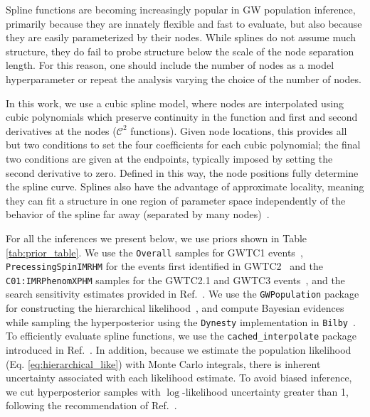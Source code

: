 \documentclass[%
 reprint,
 amsmath,amssymb,
 aps,
 prd,
]{revtex4-2}
\begin{document}
Spline functions are becoming increasingly popular in \ac{GW} population inference, primarily because they are innately flexible and fast to evaluate, but also because they are easily parameterized by their nodes. While splines do not assume much structure, they do fail to probe structure below the scale of the node separation length. For this reason, one should include the number of nodes as a model hyperparameter or repeat the analysis varying the choice of the number of nodes. 

In this work, we use a cubic spline model, where nodes are interpolated using cubic polynomials which preserve continuity in the function and first and second derivatives at the nodes ($\mathcal{C}^2$ functions). Given node locations, this provides all but two conditions to set the four coefficients for each cubic polynomial; the final two conditions are given at the endpoints, typically imposed by setting the second derivative to zero. Defined in this way, the node positions fully determine the spline curve. Splines also have the advantage of approximate locality, meaning they can fit a structure in one region of parameter space independently of the behavior of the spline far away (separated by many nodes)~\cite{DeBoor_1976}. 

For all the inferences we present below, we use priors shown in Table \ref{tab:prior_table}. We use the {\tt Overall} samples for GWTC1 events~\cite{gwtc1_pe}, {\tt PrecessingSpinIMRHM} for the events first identified in GWTC2~\cite{gwtc2_pe} and the {\tt C01:IMRPhenomXPHM} samples for the GWTC2.1 and GWTC3 events~\cite{ligo_scientific_collaboration_and_virgo_2022_6513631, ligo_scientific_collaboration_and_virgo_2023_8177023}, and the search sensitivity estimates provided in Ref.~\cite{ligo_scientific_collaboration_and_virgo_2023_7890398}. We use the {\tt GWPopulation} package for constructing the hierarchical likelihood~\cite{Talbot:2019}, and compute Bayesian evidences while sampling the hyperposterior using the {\tt Dynesty} implementation in {\tt Bilby}~\cite{Speagle_2020,Ashton:2018jfp}. To efficiently evaluate spline functions, we use the {\tt cached\_interpolate} package introduced in Ref.~\cite{Golomb:2022bon}. In addition, because we estimate the population likelihood (Eq. \ref{eq:hierarchical_like}) with Monte Carlo integrals, there is inherent uncertainty associated with each likelihood estimate. To avoid biased inference, we cut hyperposterior samples with $\log$-likelihood uncertainty greater than 1, following the recommendation of Ref.~\cite{Talbot:2023pex}.
\end{document}

